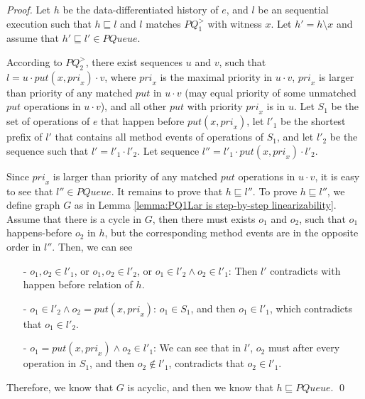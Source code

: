 \begin {proof}

Let $h$ be the data-differentiated history of $e$, and $l$ be an sequential execution such that $h \sqsubseteq l$ and $l$ matches $\textit{PQ}_1^{>}$ with witness $x$. Let $h'=h \setminus x$ and assume that $h' \sqsubseteq l' \in \textit{PQueue}$.

According to $\textit{PQ}_2^{>}$, there exist sequences $u$ and $v$, such that $l=u \cdot \textit{put}(x,\textit{pri}_x) \cdot v$, where $\textit{pri}_x$ is the maximal priority in $u \cdot v$, $\textit{pri}_x$ is larger than priority of any matched $\textit{put}$ in $u \cdot v$ (may equal priority of some unmatched $\textit{put}$ operations in $u \cdot v$), and all other $\textit{put}$ with priority $\textit{pri}_x$ is in $u$. Let $S_1$ be the set of operations of $e$ that happen before $\textit{put}(x,\textit{pri}_x)$, let $l'_1$ be the shortest prefix of $l'$ that contains all method events of operations of $S_1$, and let $l'_2$ be the sequence such that $l' = l'_1 \cdot l'_2$. Let sequence $l'' = l'_1 \cdot \textit{put}(x,\textit{pri}_x) \cdot l'_2$.

Since $\textit{pri}_x$ is larger than priority of any matched $\textit{put}$ operations in $u \cdot v$, it is easy to see that $l'' \in \textit{PQueue}$. It remains to prove that $h \sqsubseteq l''$. To prove $h \sqsubseteq l''$, we define graph $G$ as in Lemma \ref{lemma:PQ1Lar is step-by-step linearizability}. Assume that there is a cycle in $G$, then there must exists $o_1$ and $o_2$, such that $o_1$ happens-before $o_2$ in $h$, but the corresponding method events are in the opposite order in $l''$. Then, we can see

\begin{itemize}
\setlength{\itemsep}{0.5pt}
\item[-] $o_1,o_2 \in l'_1$, or $o_1,o_2 \in l'_2$, or $o_1 \in l'_2 \wedge o_2 \in l'_1$: Then $l'$ contradicts with happen before relation of $h$.

\item[-] $o_1 \in l'_2 \wedge o_2 = \textit{put}(x,\textit{pri}_x)$: $o_1 \in S_1$, and then $o_1 \in l'_1$, which contradicts that $o_1 \in l'_2$.

\item[-] $o_1 = \textit{put}(x,\textit{pri}_x) \wedge o_2 \in l'_1$: We can see that in $l'$, $o_2$ must after every operation in $S_1$, and then $o_2 \notin l'_1$, contradicts that $o_2 \in l'_1$.
\end{itemize}

Therefore, we know that $G$ is acyclic, and then we know that $h \sqsubseteq \textit{PQueue}$. \qed
\end {proof}


